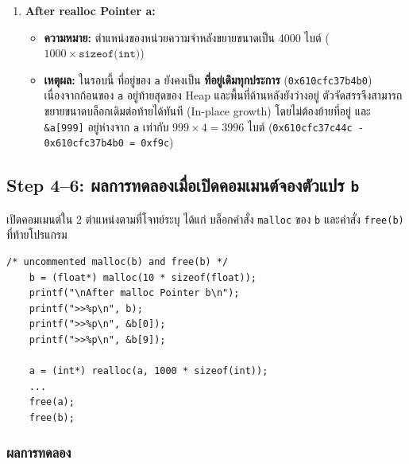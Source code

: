 \documentclass[a4paper,11pt]{article}
\newcommand{\code}[1]{\texttt{#1}}
\begin{document}
\begin{enumerate}[leftmargin=*]
  \item \textbf{After realloc Pointer a:}
    \begin{itemize}
      \item \textbf{ความหมาย:} ตำแหน่งของหน่วยความจำหลังขยายขนาดเป็น 4000 ไบต์ ($1000 \times \code{sizeof(int)}$)
      \item \textbf{เหตุผล:} ในรอบนี้ ที่อยู่ของ \code{a} ยังคงเป็น \textbf{ที่อยู่เดิมทุกประการ} (\code{0x610cfc37b4b0}) เนื่องจากก้อนของ \code{a} อยู่ท้ายสุดของ Heap และพื้นที่ด้านหลังยังว่างอยู่ ตัวจัดสรรจึงสามารถขยายขนาดบล็อกเดิมต่อท้ายได้ทันที (In-place growth) โดยไม่ต้องย้ายที่อยู่ และ \code{\&a[999]} อยู่ห่างจาก \code{a} เท่ากับ $999 \times 4 = 3996$ ไบต์ (\code{0x610cfc37c44c - 0x610cfc37b4b0 = 0xf9c})
    \end{itemize}
\end{enumerate}

\subsection{Step 4--6: ผลการทดลองเมื่อเปิดคอมเมนต์จองตัวแปร \code{b}}

เปิดคอมเมนต์ใน 2 ตำแหน่งตามที่โจทย์ระบุ ได้แก่ บล็อกคำสั่ง \code{malloc} ของ \code{b} และคำสั่ง \code{free(b)} ที่ท้ายโปรแกรม

\begin{lstlisting}[style=cstyle,caption={\code{src/q3\_alloc\_b.c} ส่วนที่มีการเปิดคอมเมนต์}]
    /* uncommented malloc(b) and free(b) */
    b = (float*) malloc(10 * sizeof(float));
    printf("\nAfter malloc Pointer b\n");
    printf(">>%p\n", b);
    printf(">>%p\n", &b[0]);
    printf(">>%p\n", &b[9]);

    a = (int*) realloc(a, 1000 * sizeof(int));
    ...
    free(a);
    free(b);
\end{lstlisting}

\subsubsection{ผลการทดลอง}
\end{document}
